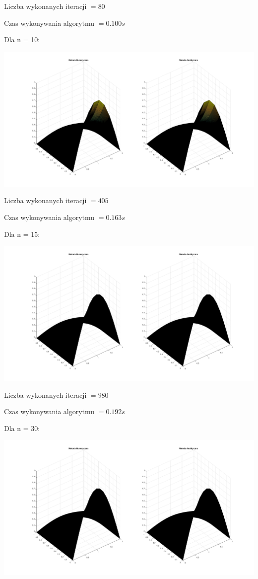 Liczba wykonanych iteracji $ = 80 $

Czas wykonywania algorytmu $ = 0.100 s$

Dla n = 10:

{\centering
	
	\includegraphics{Lab7/charts/ftcs/10.png}
	
}

Liczba wykonanych iteracji $ = 405 $

Czas wykonywania algorytmu $ = 0.163 s$

\newpage

Dla n = 15:

{\centering
	
	\includegraphics{Lab7/charts/ftcs/15.png}
	
}

Liczba wykonanych iteracji $ = 980 $

Czas wykonywania algorytmu $ = 0.192 s$

Dla n = 30:

{\centering
	
	\includegraphics{Lab7/charts/ftcs/15.png}
	
}

